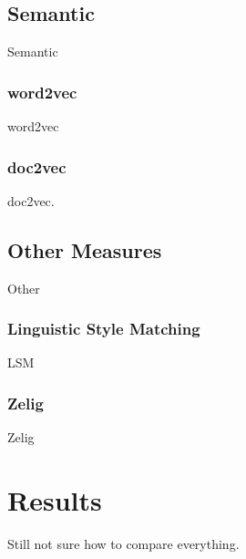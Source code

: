 \documentclass[conference]{IEEEtran}
\begin{document}
\subsection{Semantic}
Semantic

\subsubsection{word2vec}
word2vec\cite{mikolov2013distributed}

\subsubsection{doc2vec}
doc2vec\cite{le2014distributed}.


\subsection{Other Measures}
Other

\subsubsection{Linguistic Style Matching}
LSM\cite{niederhoffer2002linguistic}

\subsubsection{Zelig}
Zelig\cite{jones2014finding}


\section{Results}
Still not sure how to compare everything.

%
%
\end{document}
